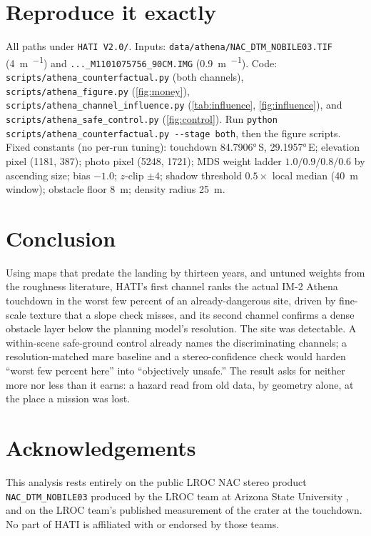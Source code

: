 \documentclass[11pt]{article}
\begin{document}
\section{Reproduce it exactly}

All paths under \texttt{HATI V2.0/}. Inputs: \texttt{data/athena/NAC\_DTM\_NOBILE03.TIF}
(\SI{4}{\meter\per\px}) and \texttt{...\_M1101075756\_90CM.IMG} (\SI{0.9}{\meter\per\px}).
Code: \texttt{scripts/athena\_counterfactual.py} (both channels),
\texttt{scripts/athena\_figure.py} (\cref{fig:money}),
\texttt{scripts/athena\_channel\_influence.py} (\cref{tab:influence}, \cref{fig:influence}),
and \texttt{scripts/athena\_safe\_control.py} (\cref{fig:control}).
Run \texttt{python scripts/athena\_counterfactual.py -{}-stage both}, then the
figure scripts. Fixed constants (no per-run tuning): touchdown \ang{84.7906}\,S,
\ang{29.1957}\,E; elevation pixel (1181, 387); photo pixel (5248, 1721); MDS weight
ladder $1.0/0.9/0.8/0.6$ by ascending size; bias $-1.0$; $z$-clip $\pm4$; shadow
threshold $0.5\times$ local median (\SI{40}{\meter} window); obstacle floor
\SI{8}{\meter}; density radius \SI{25}{\meter}.

\section{Conclusion}

Using maps that predate the landing by thirteen years, and untuned weights from the
roughness literature, HATI's first channel ranks the actual IM-2 Athena touchdown in
the worst few percent of an already-dangerous site, driven by fine-scale texture that
a slope check misses, and its second channel confirms a dense obstacle layer below
the planning model's resolution. The site was detectable. A within-scene safe-ground control already names the
discriminating channels; a resolution-matched mare baseline and a stereo-confidence
check would harden ``worst few percent here'' into ``objectively unsafe.'' The result asks for neither more nor less than it
earns: a hazard read from old data, by geometry alone, at the place a mission was
lost.

\section*{Acknowledgements}
This analysis rests entirely on the public LROC NAC stereo product
\texttt{NAC\_DTM\_NOBILE03} produced by the LROC team at Arizona State University
\autocite{robinson2010}, and on the LROC team's published measurement of the crater at
the touchdown. No part of HATI is affiliated with or endorsed by those teams.

\printbibliography[heading=bibintoc,title={References}]
\end{document}
